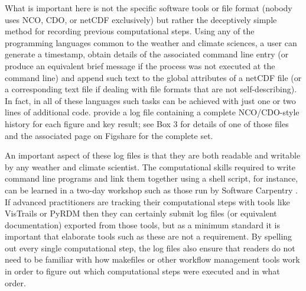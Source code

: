 What is important here is not the specific software tools or file format (nobody uses NCO, CDO, or netCDF exclusively) but rather the deceptively simple method for recording previous computational steps. Using any of the programming languages common to the weather and climate sciences, a user can generate a timestamp, obtain details of the associated command line entry (or produce an equivalent brief message if the process was not executed at the command line) and append such text to the global attributes of a netCDF file (or a corresponding text file if dealing with file formats that are not self-describing). In fact, in all of these languages such tasks can be achieved with just one or two lines of additional code. \citet{Irving2016} provide a log file containing a complete NCO/CDO-style history for each figure and key result; see Box 3 for details of one of those files and the associated page on Figshare \citep{Irving2015} for the complete set.

An important aspect of these log files is that they are both readable and writable by any weather and climate scientist. The computational skills required to write command line programs and link them together using a shell script, for instance, can be learned in a two-day workshop such as those run by Software Carpentry \citep{Wilson2014}. If advanced practitioners are tracking their computational steps with tools like VisTrails or PyRDM then they can certainly submit log files (or equivalent documentation) exported from those tools, but as a minimum standard it is important that elaborate tools such as these are not a requirement. By spelling out every single computational step, the log files also ensure that readers do not need to be familiar with how makefiles or other workflow management tools work in order to figure out which computational steps were executed and in what order. 


